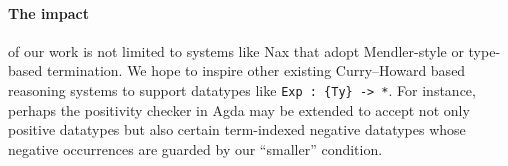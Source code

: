\documentclass[a4paper]{easychair} %
\begin{document}
\paragraph{The impact\!\!} of our work is not limited to
systems like Nax that adopt Mendler-style or type-based termination.
We hope to inspire other existing Curry--Howard based reasoning systems
to support datatypes like \texttt{Exp\,:\,\{Ty\}\,->\,*}.
For instance, perhaps the positivity checker in Agda may be extended to accept
not only positive datatypes but also certain term-indexed negative datatypes
whose negative occurrences are guarded by our ``smaller'' condition.

\end{document}
